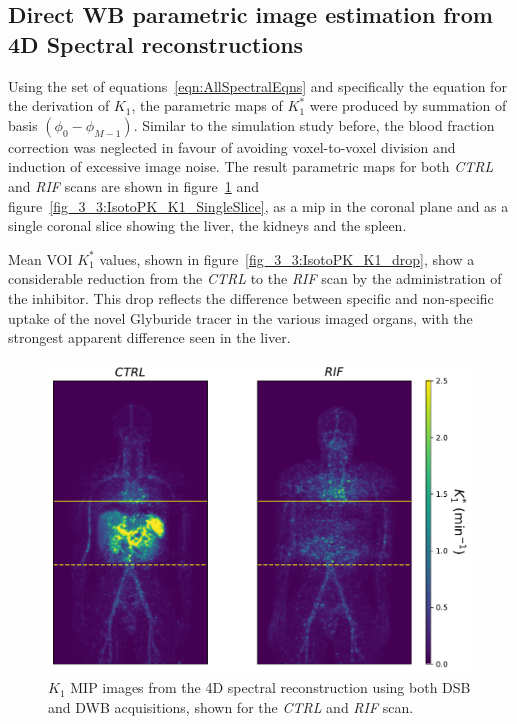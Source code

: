 \subsection{Direct WB parametric image estimation from 4D Spectral reconstructions}
Using the set of equations~\ref{eqn:AllSpectralEqns} and specifically the equation for the derivation of $K_1$, the parametric maps of $K_1^{*}$ were produced by summation of basis $(\phi_0-\phi_{M-1})$. Similar to the simulation study before, the blood fraction correction was neglected in favour of avoiding voxel-to-voxel division and induction of excessive image noise. The result parametric maps for both \textit{CTRL} and \textit{RIF} scans are shown in figure~\ref{fig_3_3:IsotoPK_K1_MIP} and figure~\ref{fig_3_3:IsotoPK_K1_SingleSlice}, as a \gls{mip} in the coronal plane and as a single coronal slice showing the liver, the kidneys and the spleen.

Mean VOI $K_1^{*}$ values, shown in figure~\ref{fig_3_3:IsotoPK_K1_drop}, show a considerable reduction from the \textit{CTRL} to the \textit{RIF} scan by the administration of the inhibitor. This drop reflects the difference between specific and non-specific uptake of the novel Glyburide tracer in the various imaged organs, with the strongest apparent difference seen in the liver.

\begin{figure} [h!]
\centering
\includegraphics[scale=0.5,angle=0]{3_Results/3_3_DWB_Reconstruction/figures/3_3_IsotoPK_K1_MIPs.pdf}
\caption{$K_1$ MIP images from the 4D spectral reconstruction using both DSB and DWB acquisitions, shown for the \textit{CTRL} and \textit{RIF} scan.}
\label{fig_3_3:IsotoPK_K1_MIP}
\end{figure} 

